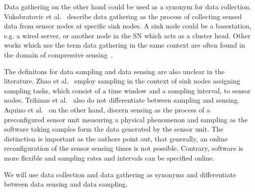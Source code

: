 Data gathering on the other hand could be used as a synonym for data
collection. Vukobratovic et al.~\cite{vukobratovic2010rateless} describe data
gathering as the process of collecting sensed data from sensor nodes at
specific sink nodes. A sink node could be a basestation, e.g. a wired server,
or another node in the \ac{SN} which acts as a cluster head. Other works which
use the term data gathering in the same context are often found in the domain
of compressive sensing~\cite{cheng2013stcdg,luo2009compressive,wang2012data}.
\par
The definitons for data sampling and data sensing are also unclear in the
literature.
Zhao et al.~\cite{zhao2016cats} employ sampling in the context of
sink nodes assigning sampling tasks, which consist of a time window and a
sampling interval, to sensor nodes. Trihinas et al.~\cite{trihinas2015adam}
also do not differentiate between sampling and sensing. Aquino et
al.~\cite{aquino2014musa} on the other hand, discern sensing as the process of
a preconfigured sensor unit measuring a physical phenomenon and sampling as the
software taking samples form the data generated by the sensor unit. The
distinction is important as the authors point out, that generally, an online
reconfiguration of the sensor sensing times is not possible. Contrary, software
is more flexible and sampling rates and intervals can be specified online.
\par
We will use data collection and data gathering as synonyms and differentiate
between data sensing and data sampling.


